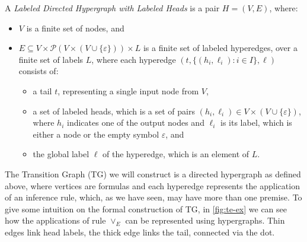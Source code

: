 \begin{definition}
A \emph{Labeled Directed Hypergraph with Labeled Heads} is a pair $H = (V, E)$, where:
\begin{itemize}
  \item \( V \) is a finite set of nodes, and
  \item \( E \subseteq V \times \mathcal{P}(V \times (V \cup \{\varepsilon\})) \times L \) is a finite set of labeled hyperedges, over a finite set of labels $L$, where each hyperedge $(t,\{(h_i,\ell_i): i\in I\}, \ell)$ consists of:
  \begin{itemize}
    \item a tail $t$, representing a single input node from \( V \),
    \item a set of labeled heads, which is a set of pairs \( (h_i, \ell_i) \in V \times (V \cup \{\varepsilon\}) \), where \( h_i \) indicates one of the output nodes and \( \ell_i \) is its label, which is either a node or the empty symbol \( \varepsilon \), and
    \item the global label $\ell$ of the hyperedge, which is an element of \( L \).
  \end{itemize}
\end{itemize}
\end{definition}

The Transition Graph (TG) we will construct is a directed hypergraph as defined above, where vertices are formulas and each hyperedge represents the application of an inference rule, which, as we have seen, may have more than one premise.
%
%
%
To give some intuition on the formal construction of TG, in \autoref{fig:te-ex} we can see  how the applications of rule \(\vee_E\) can be represented using hypergraphs. Thin edges link head labels, the thick edge links the tail, connected via the dot.



